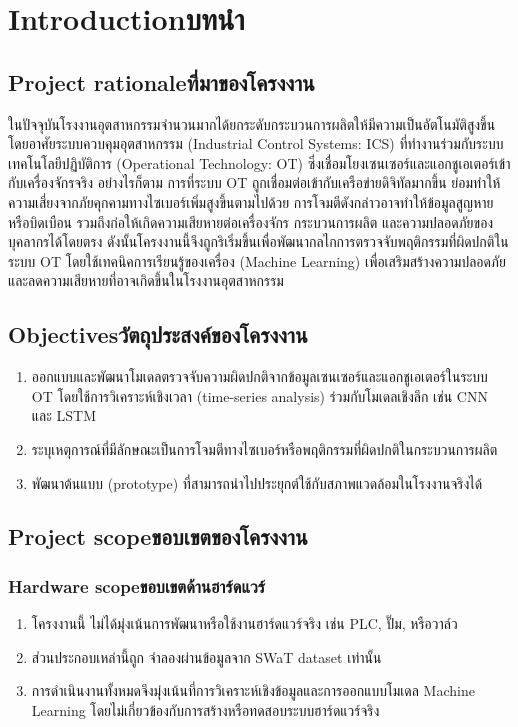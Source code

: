 \chapter{\ifenglish Introduction\else บทนำ\fi}

\section{\ifenglish Project rationale\else ที่มาของโครงงาน\fi}
ในปัจจุบันโรงงานอุตสาหกรรมจำนวนมากได้ยกระดับกระบวนการผลิตให้มีความเป็นอัตโนมัติสูงขึ้น โดยอาศัยระบบควบคุมอุตสาหกรรม (Industrial Control Systems: ICS) ที่ทำงานร่วมกับระบบเทคโนโลยีปฏิบัติการ (Operational Technology: OT) ซึ่งเชื่อมโยงเซนเซอร์และแอกชูเอเตอร์เข้ากับเครื่องจักรจริง อย่างไรก็ตาม การที่ระบบ OT ถูกเชื่อมต่อเข้ากับเครือข่ายดิจิทัลมากขึ้น ย่อมทำให้ความเสี่ยงจากภัยคุกคามทางไซเบอร์เพิ่มสูงขึ้นตามไปด้วย การโจมตีดังกล่าวอาจทำให้ข้อมูลสูญหายหรือบิดเบือน รวมถึงก่อให้เกิดความเสียหายต่อเครื่องจักร กระบวนการผลิต และความปลอดภัยของบุคลากรได้โดยตรง ดังนั้นโครงงานนี้จึงถูกริเริ่มขึ้นเพื่อพัฒนากลไกการตรวจจับพฤติกรรมที่ผิดปกติในระบบ OT โดยใช้เทคนิคการเรียนรู้ของเครื่อง (Machine Learning) เพื่อเสริมสร้างความปลอดภัยและลดความเสียหายที่อาจเกิดขึ้นในโรงงานอุตสาหกรรม

\section{\ifenglish Objectives\else วัตถุประสงค์ของโครงงาน\fi}
\begin{enumerate}
    \item ออกแบบและพัฒนาโมเดลตรวจจับความผิดปกติจากข้อมูลเซนเซอร์และแอกชูเอเตอร์ในระบบ OT โดยใช้การวิเคราะห์เชิงเวลา (time-series analysis) ร่วมกับโมเดลเชิงลึก เช่น CNN และ LSTM
    \item ระบุเหตุการณ์ที่มีลักษณะเป็นการโจมตีทางไซเบอร์หรือพฤติกรรมที่ผิดปกติในกระบวนการผลิต
    \item พัฒนาต้นแบบ (prototype) ที่สามารถนำไปประยุกต์ใช้กับสภาพแวดล้อมในโรงงานจริงได้
\end{enumerate}

\section{\ifenglish Project scope\else ขอบเขตของโครงงาน\fi}

\subsection{\ifenglish Hardware scope\else ขอบเขตด้านฮาร์ดแวร์\fi}
\begin{enumerate}
    \item โครงงานนี้ ไม่ได้มุ่งเน้นการพัฒนาหรือใช้งานฮาร์ดแวร์จริง เช่น PLC, ปั๊ม, หรือวาล์ว
    \item ส่วนประกอบเหล่านี้ถูก จำลองผ่านข้อมูลจาก SWaT dataset เท่านั้น
    \item การดำเนินงานทั้งหมดจึงมุ่งเน้นที่การวิเคราะห์เชิงข้อมูลและการออกแบบโมเดล Machine Learning โดยไม่เกี่ยวข้องกับการสร้างหรือทดสอบระบบฮาร์ดแวร์จริง
\end{enumerate}


